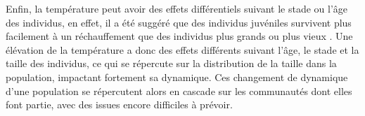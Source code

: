 Enfin, la température peut avoir des effets différentiels suivant le stade ou
l'âge des individus, en effet, il a été suggéré que des individus juvéniles
survivent plus facilement à un réchauffement que des individus plus grands ou
plus vieux \autocites{peck2009a}. Une élévation de la température a donc des
effets différents suivant l'âge, le stade et la taille des individus, ce qui se
répercute sur la distribution de la taille dans la population, impactant
fortement sa dynamique. Ces changement de dynamique d'une population se
répercutent alors en cascade sur les communautés dont elles font partie, avec
des issues encore difficiles à prévoir. 
